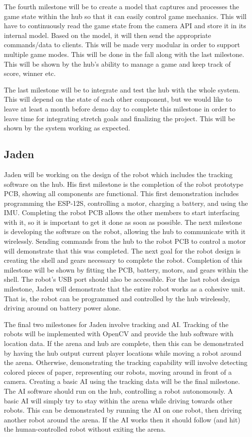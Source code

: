 \documentclass[11pt]{ieeeconf}
\begin{document}
The fourth milestone will be to create a model that captures and processes the game state within the hub so that it can easily control game mechanics. This will have to continuously read the game state from the camera API and store it in its internal model. Based on the model, it will then send the appropriate commands/data to clients. This will be made very modular in order to support multiple game modes. This will be done in the fall along with the last milestone. This will be shown by the hub's ability to manage a game and keep track of score, winner etc.

The last milestone will be to integrate and test the hub with the whole system. This will depend on the state of each other component, but we would like to leave at least a month before demo day to complete this milestone in order to leave time for integrating stretch goals and finalizing the project. This will be shown by the system working as expected.

\subsection{Jaden}
Jaden will be working on the design of the robot which includes the tracking software on the hub. His first milestone is the completion of the robot prototype PCB, showing all components are functional. This first demonstration includes programming the ESP-12S, controlling a motor, charging a battery, and using the IMU. Completing the robot PCB allows the other members to start interfacing with it, so it is important to get it done as soon as possible. The next milestone is developing the software on the robot, allowing the hub to communicate with it wirelessly. Sending commands from the hub to the robot PCB to control a motor will demonstrate that this was completed. The next goal for the robot design is creating the shell and gears necessary to complete the robot. Completion of this milestone will be shown by fitting the PCB, battery, motors, and gears within the shell. The robot's USB port should also be accessible. For the last robot design milestone, Jaden will demonstrate that the entire robot works as a cohesive unit. That is, the robot can be programmed and controlled by the hub wirelessly, driving around on battery power alone.

The final two milestones for Jaden involve tracking and AI. Tracking of the robots will be implemented with OpenCV and provide the hub software with location data. If the arena and hub are complete, then this can be demonstrated by having the hub output current player locations while moving a robot around the arena. Otherwise, demonstrating the tracking capability will involve detecting colored pieces of paper, representing our robots, moving around in front of a camera. Creating a basic AI using the tracking data will be the final milestone. The AI software should run on the hub, controlling a robot autonomously. A basic AI will simply try to stay within the arena while driving towards other robots. This can be demonstrated by running the AI on one robot, then driving another robot around the arena. If the AI works then it should follow (and hit) the human-controlled robot without exiting the arena.
\end{document}

